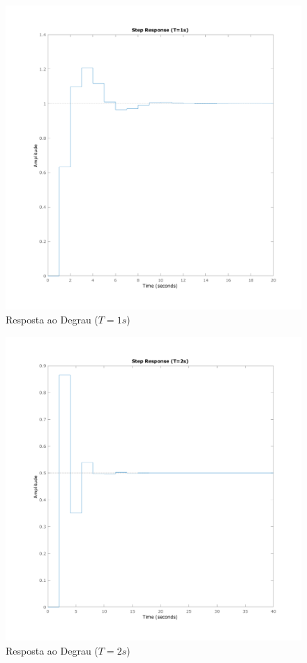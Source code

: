 \documentclass[a4paper,11pt]{article}
\begin{document}
\begin{figure}[H]
    \centering
    \includegraphics[width=0.8\linewidth]{img/exsim3-step-t1000ms.png}
    \caption{ Resposta ao Degrau ($T=1s$)}
\end{figure}

\begin{figure}[H]
    \centering
    \includegraphics[width=0.8\linewidth]{img/exsim3-step-t2000ms.png}
    \caption{ Resposta ao Degrau ($T=2s$)}
\end{figure}

\end{document}

